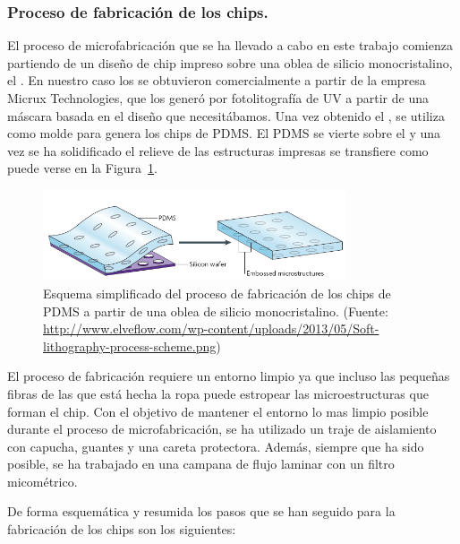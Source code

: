 \subsubsection{Proceso de fabricación de los chips.}

El proceso de microfabricación que se ha llevado a cabo en este trabajo comienza partiendo de un diseño de chip impreso sobre una oblea de silicio monocristalino, el . En nuestro caso los  se obtuvieron comercialmente a partir de la empresa Micrux Technologies, que los generó por fotolitografía de UV a partir de una máscara basada en el diseño que necesitábamos. Una vez obtenido el , se utiliza como molde para genera los chips de PDMS. El PDMS se vierte sobre el  y una vez se ha solidificado el relieve de las estructuras impresas se transfiere como puede verse en la Figura~\ref{fig:procedimiento_pdms}.

\begin{figure}[H]
    \begin{center}
         \includegraphics[width=0.8\textwidth]{3_metodologia/pdms.png}
    \end{center}
    \caption{\small Esquema simplificado del proceso de fabricación de los chips de PDMS a partir de una oblea de silicio monocristalino. (Fuente: \url{http://www.elveflow.com/wp-content/uploads/2013/05/Soft-lithography-process-scheme.png})}
    \label{fig:procedimiento_pdms}
\end{figure}


El proceso de fabricación requiere un entorno limpio ya que incluso las pequeñas fibras de las que está hecha la ropa puede estropear las microestructuras que forman el chip. Con el objetivo de mantener el entorno lo mas limpio posible durante el proceso de microfabricación, se ha utilizado un traje de aislamiento con capucha, guantes y una careta protectora. Además, siempre que ha sido posible, se ha trabajado en una campana de flujo laminar con un filtro micométrico.

De forma esquemática y resumida los pasos que se han seguido para la fabricación de los chips son los siguientes:

